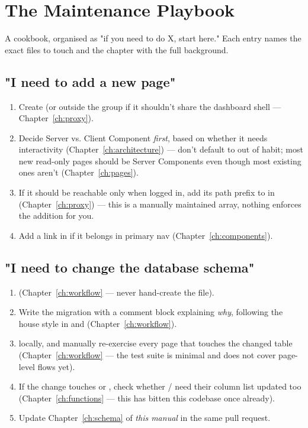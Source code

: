 \chapter{The Maintenance Playbook}
\label{ch:playbook}

A cookbook, organised as "if you need to do X, start here." Each entry names the exact files to touch and the chapter with the full background.

\section{"I need to add a new page"}
\begin{enumerate}
  \item Create  (or outside the group if it shouldn't share the dashboard shell — Chapter~\ref{ch:proxy}).
  \item Decide Server vs. Client Component \emph{first}, based on whether it needs interactivity (Chapter~\ref{ch:architecture}) — don't default to  out of habit; most new read-only pages should be Server Components even though most existing ones aren't (Chapter~\ref{ch:pages}).
  \item If it should be reachable only when logged in, add its path prefix to  in  (Chapter~\ref{ch:proxy}) — this is a manually maintained array, nothing enforces the addition for you.
  \item Add a link in  if it belongs in primary nav (Chapter~\ref{ch:components}).
\end{enumerate}

\section{"I need to change the database schema"}
\begin{enumerate}
  \item {} (Chapter~\ref{ch:workflow} — never hand-create the file).
  \item Write the migration with a comment block explaining \emph{why}, following the house style in  and  (Chapter~\ref{ch:workflow}).
  \item {} locally, and manually re-exercise every page that touches the changed table (Chapter~\ref{ch:workflow} — the test suite is minimal and does not cover page-level flows yet).
  \item If the change touches  or , check whether / need their  column list updated too (Chapter~\ref{ch:functions} — this has bitten this codebase once already).
  \item Update Chapter~\ref{ch:schema} of \emph{this manual} in the same pull request.
\end{enumerate}

